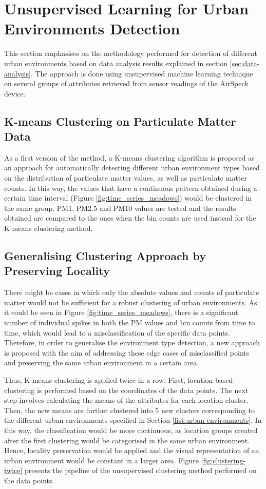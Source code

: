 \documentclass[bsc,frontabs,twoside,singlespacing,parskip,deptreport]{infthesis}     %
\begin{document}
\section{Unsupervised Learning for Urban Environments Detection}

This section emphasises on the methodology performed for detection of different urban environments based on data analysis results explained in section \ref{sec:data-analysis}. The approach is done using unsupervised machine learning technique on several groups of attributes retrieved from sensor readings of the AirSpeck device.

\subsection{K-means Clustering on Particulate Matter Data}
\label{subsec:k-means-methodology}

As a first version of the method, a K-means clustering algorithm is proposed as an approach for automatically detecting different urban environment types based on the distribution of particulate matter values, as well as particulate matter counts. In this way, the values that have a continuous pattern obtained during a certain time interval (Figure \ref{fig:time_series_meadows}) would be clustered in the same group. PM1, PM2.5 and PM10 values are tested and the results obtained are compared to the ones when the bin counts are used instead for the K-means clustering method.

\subsection{Generalising Clustering Approach by Preserving Locality}
\label{subsec:generic-clustering}

There might be cases in which only the absolute values and counts of particulate matter would not be sufficient for a robust clustering of urban environments. As it could be seen in Figure \ref{fig:time_series_meadows}, there is a significant number of individual spikes in both the PM values and bin counts  from time to time, which would lead to a misclassification of the specific data points. Therefore, in order to generalise the environment type detection, a new approach is proposed with the aim of addressing these edge cases of misclassified points and preserving the same urban environment in a certain area. 

Thus, K-means clustering is applied twice in a row. First, location-based clustering is performed based on the coordinates of the data points. The next step involves calculating the means of the attributes for each location cluster. Then, the new means are further clustered into 5 new clusters corresponding to the different urban environments specified in Section \ref{list:urban-environments}. In this way, the classification would be more continuous, as location groups created after the first clustering would be categorised in the same urban environment. Hence, locality preservation would be applied and  the visual representation of an urban environment would be constant in a larger area. Figure \ref{fig:clustering-twice} presents the pipeline of the unsupervised clustering method performed on the data points.
\end{document}
